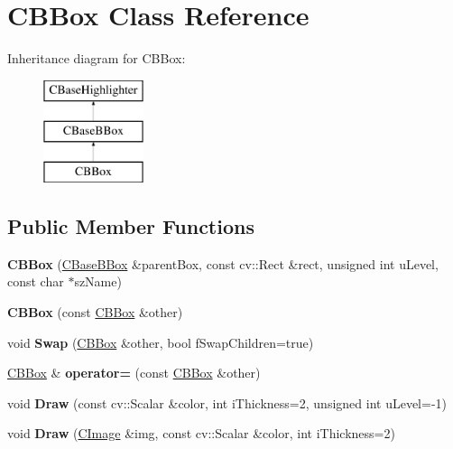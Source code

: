 \hypertarget{class_c_b_box}{}\section{C\+B\+Box Class Reference}
\label{class_c_b_box}
Inheritance diagram for C\+B\+Box\+:\begin{figure}[H]
\begin{center}
\leavevmode
\includegraphics[height=3.000000cm]{class_c_b_box}
\end{center}
\end{figure}
\subsection*{Public Member Functions}
\begin{DoxyCompactItemize}
\item 
\mbox{\label{class_c_b_box_acbc98a4ce72444658d4adcc1a86944b5}} 
{\bfseries C\+B\+Box} (\hyperlink{class_c_base_b_box}{C\+Base\+B\+Box} \&parent\+Box, const cv\+::\+Rect \&rect, unsigned int u\+Level, const char $\ast$sz\+Name)
\item 
\mbox{\label{class_c_b_box_a2cab53d1fa862cdafbf8a73d35336344}} 
{\bfseries C\+B\+Box} (const \hyperlink{class_c_b_box}{C\+B\+Box} \&other)
\item 
\mbox{\label{class_c_b_box_a9fa5731118363787c5e979798c27b924}} 
void {\bfseries Swap} (\hyperlink{class_c_b_box}{C\+B\+Box} \&other, bool f\+Swap\+Children=true)
\item 
\mbox{\label{class_c_b_box_a61f274eb6091494a6fb6b1497c975919}} 
\hyperlink{class_c_b_box}{C\+B\+Box} \& {\bfseries operator=} (const \hyperlink{class_c_b_box}{C\+B\+Box} \&other)
\item 
\mbox{\label{class_c_b_box_a7d39f53184eb6d21df0816be7e104a13}} 
void {\bfseries Draw} (const cv\+::\+Scalar \&color, int i\+Thickness=2, unsigned int u\+Level=-\/1)
\item 
\mbox{\label{class_c_b_box_a480b8b1e36efb75aa76e8d90437b816e}} 
void {\bfseries Draw} (\hyperlink{class_c_image}{C\+Image} \&img, const cv\+::\+Scalar \&color, int i\+Thickness=2)
\end{DoxyCompactItemize}
